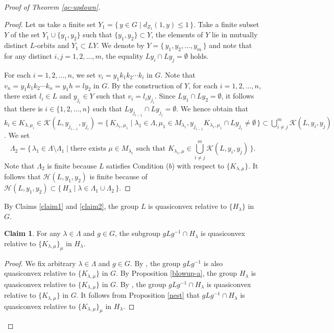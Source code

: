 \documentclass{amsart}
\theoremstyle{definition}
\newtheorem{Claim}[Thm]{Claim}
\begin{document}
\begin{proof}[Proof of Theorem \ref{qc-updown}]
\begin{proof}
Let us take a finite set $Y_1=\{\,y \in G \mid d_{Z_1}(1,y)\leq 1 \,\}$. 
Take a finite subset $Y$ of the set $Y_1 \cup \{y_1,y_2\}$ such that $\{y_1,y_2\}\subset Y$, the elements of $Y$ lie in mutually distinct $L$-orbits and $Y_1 \subset LY$. 
We denote by $Y=\{\,y_1,y_2,\ldots,y_m\,\}$ and note that for any distinct $i, j=1,2,\ldots,m$, the equality $Ly_i \cap Ly_j=\emptyset$ holds. 

For each $i=1,2,\ldots, n$, we set $v_i=y_1k_1k_2\cdots k_i$ in $G$. 
Note that $v_n=y_1k_1k_2\cdots k_n=y_1h=ly_2$ in $G$. 
By the construction of $Y$, for each $i=1,2,\ldots,n$, there exist $l_i\in L$ and $y_{j_i} \in Y$ such that $v_i=l_iy_{j_i}$. 
Since $Ly_1\cap Ly_2 = \emptyset$, it follows that there is $i\in \{1,2,\ldots, n\}$ such that $Ly_{j_{i-1}}\cap Ly_{j_i}=\emptyset$. 
We hence obtain that $k_i\in K_{\lambda,\mu_i}\in {\mathscr{K}}(L,y_{j_{i-1}},y_{j_i})=\{\,K_{\lambda_1,\mu_1} \mid \lambda_{1} \in \Lambda, \mu_{1} \in M_{\lambda_{1}}, y_{j_{i-1}}K_{\lambda_1,\mu_1}\cap Ly_{j_i}\ne \emptyset\,\} \subset \bigcup_{i\ne j}^m{\mathscr{K}}(L,y_i,y_j)$. 
We set 
$$
\Lambda_2=\{\,\lambda_1\in \Lambda\setminus \Lambda_1 \mid \text{there exists }\mu\in M_{\lambda_1} \text{ such that } K_{\lambda_1,\mu}\in \bigcup_{i\ne j}^m{\mathscr{K}}(L,y_i,y_j)\,\}.
$$ 
Note that $\Lambda_2$ is finite because $L$ satisfies Condition ($b$) with respect to $\{K_{\lambda,\mu}\}$. 
It follows that ${\mathscr{H}}(L,y_1,y_2)$ is finite because of ${\mathscr{H}}(L,y_1,y_2)\subset \{\,H_\lambda \mid \lambda\in \Lambda_1\cup \Lambda_2\,\}$.  
\end{proof}

By Claims \ref{claim1} and \ref{claim2}, the group $L$ is quasiconvex relative to $\{H_\lambda\}$ in $G$. 

\begin{Claim}\label{claim3}
For any $\lambda\in\Lambda$ and $g\in G$, the subgroup $gLg^{-1}\cap H_\lambda$ is quasiconvex relative to $\{K_{\lambda,\mu}\}_\mu$ in $H_\lambda$. 
\end{Claim}

\begin{proof}
We fix arbitrary $\lambda\in\Lambda$ and $g\in G$. 
By \cite[Corollary 4.24]{M-O-Y1}, the group $gLg^{-1}$ is also quasiconvex relative to $\{K_{\lambda,\mu}\}$ in $G$. 
By Proposition \ref{blowup-a}, the group $H_\lambda$ is quasiconvex relative to $\{K_{\lambda,\mu}\}$ in $G$. 
By \cite[Theorem 1.3]{M-O-Y1}, the group $gLg^{-1}\cap H_\lambda$ is quasiconvex relative to $\{K_{\lambda,\mu}\}$ in $G$. 
It follows from Proposition \ref{nest} that $gLg^{-1}\cap H_\lambda$ is quasiconvex relative to  $\{K_{\lambda,\mu}\}_\mu$ in $H_\lambda$.  
\end{proof}


\end{proof}
\end{document}
